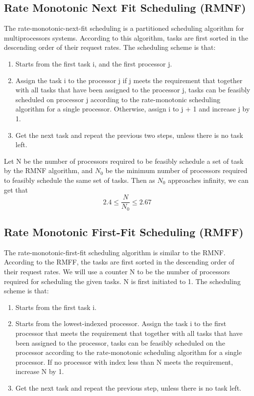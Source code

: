 \documentclass[preprint,12pt]{elsarticle}
\begin{document}
\subsection{Rate Monotonic Next Fit Scheduling (RMNF)}
The rate-monotonic-next-fit scheduling \cite{dhall1978real} is a partitioned scheduling algorithm for multiprocessors systems. According to this algorithm, tasks are first sorted in the descending order of their request rates. The scheduling scheme is that:
\begin{enumerate}
\item Starts from the first task i, and the first processor j. 
\item Assign the task i to the processor j if j meets the requirement that together with all tasks that have been assigned to the processor j, tasks can be feasibly scheduled on processor j according to the rate-monotonic scheduling algorithm for a single processor. Otherwise, assign i to j + 1 and increase j by 1. 
\item Get the next task and repeat the previous two steps, unless there is no task left.
\end{enumerate}

Let N be the number of processors required to be feasibly schedule a set of task by the RMNF algorithm, and $N_0$ be the minimum number of processors required to feasibly schedule the same set of tasks. Then as $N_0$ approaches infinity, we can get that \cite{dhall1978real}
\begin{equation}
    2.4 \leq \frac{N}{N_0} \leq 2.67 
\end{equation}

\subsection{Rate Monotonic First-Fit Scheduling (RMFF)}
The rate-monotonic-first-fit scheduling algorithm \cite{dhall1978real} is similar to the RMNF. According to the RMFF, the tasks are first sorted in the descending order of their request rates. We will use a counter N to be the number of processors required for scheduling the given tasks. N is first initiated to 1. The scheduling scheme is that:
\begin{enumerate}
\item Starts from the first task i. 
\item Starts from the lowest-indexed processor. Assign the task i to the first processor that meets the requirement that together with all tasks that have been assigned to the processor, tasks can be feasibly scheduled on the processor according to the rate-monotonic scheduling algorithm for a single processor. If no processor with index less than N meets the requirement, increase N by 1. 
\item Get the next task and repeat the previous step, unless there is no task left.
\end{enumerate}
\end{document}

